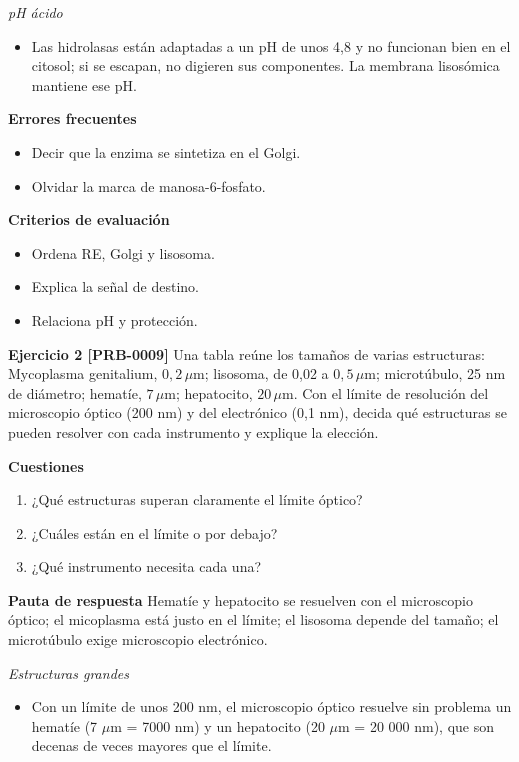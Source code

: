 \documentclass{book}
\begin{document}
\noindent\textit{pH ácido}
\begin{itemize}
\item Las hidrolasas están adaptadas a un pH de unos 4,8 y no funcionan bien en el citosol; si se escapan, no digieren sus componentes. La membrana lisosómica mantiene ese pH.
\end{itemize}

\noindent\textbf{Errores frecuentes}
\begin{itemize}
\item Decir que la enzima se sintetiza en el Golgi.
\item Olvidar la marca de manosa-6-fosfato.
\end{itemize}

\noindent\textbf{Criterios de evaluación}
\begin{itemize}
\item Ordena RE, Golgi y lisosoma.
\item Explica la señal de destino.
\item Relaciona pH y protección.
\end{itemize}

\noindent\textbf{Ejercicio 2 [PRB-0009]}
Una tabla reúne los tamaños de varias estructuras: Mycoplasma genitalium, \(0{,}2\,\mu\mathrm{m}\); lisosoma, de 0,02 a \(0{,}5\,\mu\mathrm{m}\); microtúbulo, 25 nm de diámetro; hematíe, \(7\,\mu\mathrm{m}\); hepatocito, \(20\,\mu\mathrm{m}\). Con el límite de resolución del microscopio óptico (200 nm) y del electrónico (0,1 nm), decida qué estructuras se pueden resolver con cada instrumento y explique la elección.


\noindent\textbf{Cuestiones}
\begin{enumerate}
\item ¿Qué estructuras superan claramente el límite óptico?
\item ¿Cuáles están en el límite o por debajo?
\item ¿Qué instrumento necesita cada una?
\end{enumerate}

\noindent\textbf{Pauta de respuesta}
Hematíe y hepatocito se resuelven con el microscopio óptico; el micoplasma está justo en el límite; el lisosoma depende del tamaño; el microtúbulo exige microscopio electrónico.


\noindent\textit{Estructuras grandes}
\begin{itemize}
\item Con un límite de unos 200 nm, el microscopio óptico resuelve sin problema un hematíe (7 \(\mu\)m = 7000 nm) y un hepatocito (20 \(\mu\)m = 20 000 nm), que son decenas de veces mayores que el límite.
\end{itemize}
\end{document}

